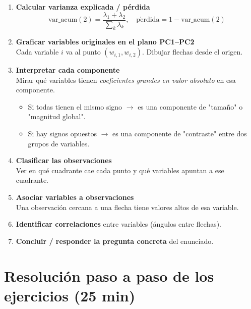 \documentclass[11pt,a4paper]{article}
\begin{document}
\begin{pasobox}
\begin{enumerate}[leftmargin=*,label=\textbf{Paso \arabic*:}]
    \item \textbf{Calcular varianza explicada / pérdida}
        \[
        \mathrm{var\_acum}(2) = \frac{\lambda_1+\lambda_2}{\sum_k \lambda_k}, \quad
        \mathrm{p\acute{e}rdida} = 1 - \mathrm{var\_acum}(2)
        \]
    \item \textbf{Graficar variables originales en el plano PC1--PC2}\\
    Cada variable $i$ va al punto $(w_{i,1}, w_{i,2})$. Dibujar flechas desde el origen.

    \item \textbf{Interpretar cada componente}\\
    Mirar qué variables tienen \emph{coeficientes grandes en valor absoluto} en esa componente.
    \begin{itemize}
        \item Si todas tienen el mismo signo $\to$ es una componente de "tamaño" o "magnitud global".
        \item Si hay signos opuestos $\to$ es una componente de "contraste" entre dos grupos de variables.
    \end{itemize}

    \item \textbf{Clasificar las observaciones}\\
    Ver en qué cuadrante cae cada punto y qué variables apuntan a ese cuadrante.

    \item \textbf{Asociar variables a observaciones}\\
    Una observación cercana a una flecha tiene valores altos de esa variable.

    \item \textbf{Identificar correlaciones} entre variables (ángulos entre flechas).

    \item \textbf{Concluir / responder la pregunta concreta} del enunciado.
\end{enumerate}
\end{pasobox}

\section{Resolución paso a paso de los ejercicios (25 min)}
\end{document}
